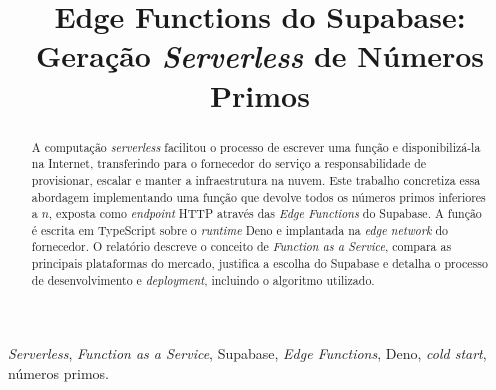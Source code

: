 \documentclass[conference]{IEEEtran}
\begin{document}
\title{Edge Functions do Supabase:\\ Geração \textit{Serverless} de Números Primos}

\author{
\and
{}
}

\maketitle

\IEEEpubidadjcol
\renewcommand{\thefootnote}{}
\renewcommand{\thefootnote}{\arabic{footnote}}

\begin{abstract}
A computação \textit{serverless} facilitou o processo de escrever uma função e disponibilizá-la na Internet, transferindo para o fornecedor do serviço a responsabilidade de provisionar, escalar e manter a infraestrutura na nuvem. Este trabalho concretiza essa abordagem implementando uma função que devolve todos os números primos inferiores a $n$, exposta como \textit{endpoint} HTTP através das \textit{Edge Functions} do Supabase. A função é escrita em TypeScript sobre o \textit{runtime} Deno e implantada na \textit{edge network} do fornecedor. O relatório descreve o conceito de \textit{Function as a Service}, compara as principais plataformas do mercado, justifica a escolha do Supabase e detalha o processo de desenvolvimento e \textit{deployment}, incluindo o algoritmo utilizado.
\end{abstract}

\begin{IEEEkeywords}
\textit{Serverless}, \textit{Function as a Service}, Supabase, \textit{Edge Functions}, Deno, \textit{cold start}, números primos.
\end{IEEEkeywords}

\end{document}
